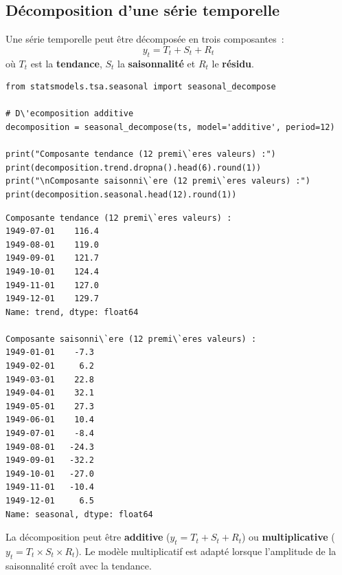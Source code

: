 \subsection{D\'ecomposition d'une s\'erie temporelle}


\begin{definition}[D\'ecomposition]
Une s\'erie temporelle peut \^etre d\'ecompos\'ee en trois composantes~:
\[
y_t = T_t + S_t + R_t
\]
o\`u $T_t$ est la \textbf{tendance}, $S_t$ la \textbf{saisonnalit\'e} et $R_t$ le \textbf{r\'esidu}.
\end{definition}

\begin{codeblock}[title=\textbf{Python}]
\begin{verbatim}
from statsmodels.tsa.seasonal import seasonal_decompose

# D\'ecomposition additive
decomposition = seasonal_decompose(ts, model='additive', period=12)

print("Composante tendance (12 premi\`eres valeurs) :")
print(decomposition.trend.dropna().head(6).round(1))
print("\nComposante saisonni\`ere (12 premi\`eres valeurs) :")
print(decomposition.seasonal.head(12).round(1))
\end{verbatim}
\end{codeblock}

\begin{codeoutput}
\begin{verbatim}
Composante tendance (12 premi\`eres valeurs) :
1949-07-01    116.4
1949-08-01    119.0
1949-09-01    121.7
1949-10-01    124.4
1949-11-01    127.0
1949-12-01    129.7
Name: trend, dtype: float64

Composante saisonni\`ere (12 premi\`eres valeurs) :
1949-01-01    -7.3
1949-02-01     6.2
1949-03-01    22.8
1949-04-01    32.1
1949-05-01    27.3
1949-06-01    10.4
1949-07-01    -8.4
1949-08-01   -24.3
1949-09-01   -32.2
1949-10-01   -27.0
1949-11-01   -10.4
1949-12-01     6.5
Name: seasonal, dtype: float64
\end{verbatim}
\end{codeoutput}

\begin{remarque}
La d\'ecomposition peut \^etre \textbf{additive} ($y_t = T_t + S_t + R_t$) ou \textbf{multiplicative} ($y_t = T_t \times S_t \times R_t$). Le mod\`ele multiplicatif est adapt\'e lorsque l'amplitude de la saisonnalit\'e cro\^it avec la tendance.
\end{remarque}

